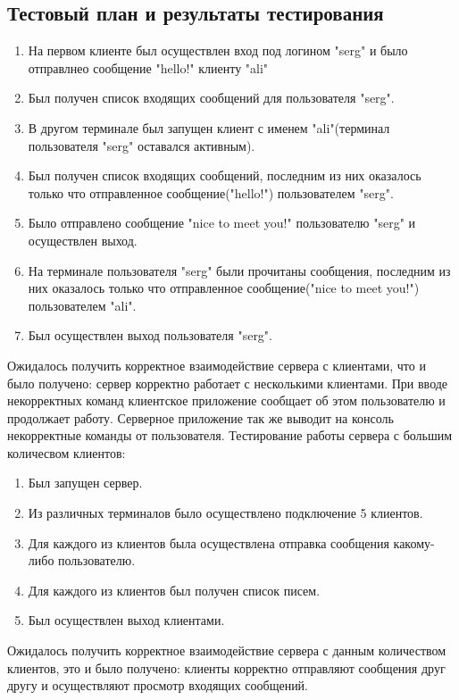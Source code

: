 \documentclass[12pt,a4paper]{report}
\begin{document}
\subsection{Тестовый план и результаты тестирования}
\begin{enumerate}
\item На первом клиенте был осуществлен вход под логином "serg" и было отправлнео сообщение "hello!" клиенту "ali"
\item Был получен список входящих сообщений для пользователя "serg".
\item В другом терминале был запущен клиент с именем "ali"(терминал пользователя "serg" оставался активным).
\item Был получен список входящих сообщений, последним из них оказалось только что отправленное сообщение("hello!") пользователем "serg".
\item Было отправлено сообщение "nice to meet you!" пользователю "serg" и осуществлен выход.
\item На терминале пользователя "serg" были прочитаны сообщения, последним из них оказалось только что отправленное сообщение("nice to meet you!") пользователем "ali".
\item Был осуществлен выход пользователя "serg".
\end{enumerate}
Ожидалось получить корректное взаимодействие сервера с клиентами, что и было получено: сервер корректно работает с несколькими клиентами.
При вводе некорректных команд клиентское приложение сообщает об этом пользователю и продолжает работу. Серверное приложение так же выводит на консоль некорректные команды от пользователя.
\linebreak
\linebreak
Тестирование работы сервера с большим количесвом клиентов:
\begin{enumerate}
\item Был запущен сервер.
\item Из различных терминалов было осуществлено подключение 5 клиентов.
\item Для каждого из клиентов была осуществлена отправка сообщения какому-либо пользователю.
\item Для каждого из клиентов был получен список писем.
\item Был осуществлен выход клиентами.
\end{enumerate}
Ожидалось получить корректное взаимодействие сервера с данным количеством клиентов, это и было получено: клиенты корректно отправляют сообщения друг другу и осуществляют просмотр входящих сообщений.
\end{document}
